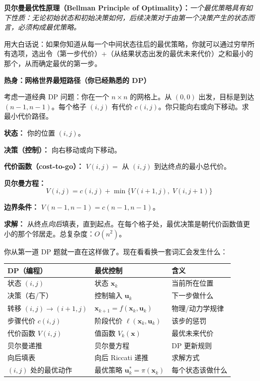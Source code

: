 \textbf{贝尔曼最优性原理（Bellman Principle of Optimality）：}\textit{一个最优策略具有如下性质：无论初始状态和初始决策如何，后续决策对于由第一个决策产生的状态而言，必须构成最优策略。}

用大白话说：如果你知道从每一个中间状态往后的最优策略，你就可以通过穷举所有选项，选出令（第一步代价）+（从结果状态出发的最优未来代价）之和最小的那个，从而确定最优的第一步。

\vspace{0.5em}
\begin{mdframed}[linewidth=1pt, innertopmargin=10pt, innerbottommargin=10pt]
\textbf{热身：网格世界最短路径（你已经熟悉的 DP）}

\vspace{0.3em}
考虑一道经典 DP 问题：你在一个 $n \times n$ 的网格上。从 $(0, 0)$ 出发，目标是到达 $(n{-}1, n{-}1)$。每个格子 $(i, j)$ 有代价 $c(i, j)$。你只能向右或向下移动。求最小代价路径。

\textbf{状态：} 你的位置 $(i, j)$。

\textbf{决策（控制）：} 向右移动或向下移动。

\textbf{代价函数（cost-to-go）：} $V(i, j) = $ 从 $(i, j)$ 到达终点的最小总代价。

\textbf{贝尔曼方程：}
\[
V(i, j) = c(i, j) + \min\{V(i+1, j), \; V(i, j+1)\}
\]

\textbf{边界条件：} $V(n{-}1, n{-}1) = c(n{-}1, n{-}1)$。

\textbf{求解：} 从终点\textit{向后}填表，直到起点。在每个格子处，最优决策是朝代价函数值更小的那个邻居走。总复杂度：$O(n^2)$。

你从第一道 DP 题就一直在这样做了。现在看看换一套词汇会发生什么：

\begin{center}
\begin{tabular}{lll}
\toprule
\textbf{DP（编程）} & \textbf{最优控制} & \textbf{含义} \\
\midrule
状态 $(i, j)$ & 状态 $\mathbf{x}_k$ & 当前所在位置 \\
决策（右/下） & 控制输入 $\mathbf{u}_k$ & 下一步做什么 \\
转移 $(i,j) \to (i+1,j)$ & $\mathbf{x}_{k+1} = f(\mathbf{x}_k, \mathbf{u}_k)$ & 物理/动力学规律 \\
步骤代价 $c(i,j)$ & 阶段代价 $\ell(\mathbf{x}_k, \mathbf{u}_k)$ & 该步的惩罚 \\
代价函数 $V(i,j)$ & 值函数 $V_k(\mathbf{x})$ & 最优未来代价 \\
贝尔曼递推 & 贝尔曼方程 & DP 更新规则 \\
向后填表 & 向后 Riccati 递推 & 求解方式 \\
$(i,j)$ 处的最优动作 & 最优策略 $\mathbf{u}_k^* = \pi(\mathbf{x}_k)$ & 每个状态该做什么 \\
\bottomrule
\end{tabular}
\end{center}


\end{mdframed}
